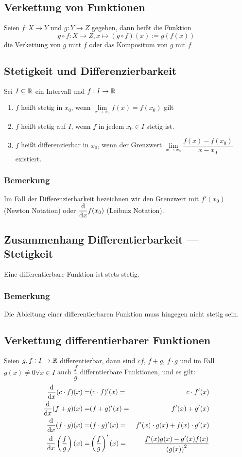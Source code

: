 \subsection{Verkettung von Funktionen}
Seien $f: X \rightarrow Y$ und $g: Y \rightarrow Z$ gegeben, dann heißt
die Funktion
\begin{equation*}
    g \circ f: X \rightarrow Z, x \mapsto (g \circ f)(x):=g(f(x))
\end{equation*}
die Verkettung von $g$ mitt $f$ oder das Kompositum von $g$ mit $f$

\subsection{Stetigkeit und Differenzierbarkeit}
Sei $I \subseteq \mathbb{R}$ ein Intervall und $f: I \rightarrow \mathbb{R}$
\begin{enumerate}[label= (\alph*)]
    \item $f$ heißt stetig in $x_0$, wenn
        $\lim\limits_{x \rightarrow x_0} f(x) = f(x_0)$ gilt
    \item $f$ heißt stetig auf $I$, wenn $f$ in jedem $x_0 \in I$ stetig ist.
    \item $f$ heißt differenzierbar in $x_0$, wenn der Grenzwert
        $\lim\limits_{x \rightarrow x_o}\dfrac{f(x)-f(x_0)}{x-x_0}$
        existiert.
\end{enumerate}

\subsubsection{Bemerkung}
Im Fall der Differenzierbarkeit bezeichnen wir den Grenzwert mit
$f'(x_0)$ (Newton Notation) oder $\dfrac{\text{d}}{\text{d}x} f(x_0)$
(Leibniz Notation).

\subsection{Zusammenhang Differentierbarkeit --- Stetigkeit}
Eine differentierbare Funktion ist stets stetig.
\subsubsection{Bemerkung}
Die Ableitung einer differentierbaren Funktion muss hingegen nicht
stetig sein.

\subsection{Verkettung differentierbarer Funktionen}
Seien $g,f:I \rightarrow \mathbb{R}$ differentierbar, dann sind $cf$, $f+g$,
$f \cdot g$ und im Fall $g(x) \neq 0 \forall x \in I$ auch $\dfrac{f}{g}$
differntierbare Funktionen, und es gilt:
\begin{eqnarray*}
    \dfrac{\text{d}}{\text{d}x} (c \cdot f)(x) = &(c \cdot f)'(x) = &c \cdot f'(x)\\
    \dfrac{\text{d}}{\text{d}x} (f + g)(x) = &(f+g)'(x) = &f'(x) + g'(x)\\
    \dfrac{\text{d}}{\text{d}x} (f \cdot g)(x) = &(f \cdot g)'(x) =
        &f'(x)\cdot g(x) + f(x) \cdot g'(x)\\
    \dfrac{\text{d}}{\text{d}x} \left(\dfrac{f}{g}\right)(x) = &\left(\dfrac{f}{g}\right)'(x) =
    & \frac{f'(x)g(x)-g'(x)f(x)}{{(g(x))}^2}
\end{eqnarray*}

